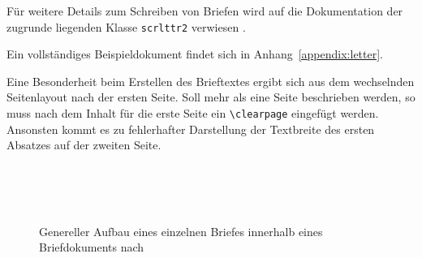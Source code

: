 Für weitere Details zum Schreiben von Briefen wird auf die Dokumentation
der zugrunde liegenden Klasse \lstinline{scrlttr2} verwiesen
\cite[S.162ff]{koma-skript}.

Ein vollständiges Beispieldokument findet sich in Anhang~\ref{appendix:letter}.

\begin{important}
Eine Besonderheit beim Erstellen des Brieftextes ergibt sich aus dem wechselnden
Seitenlayout nach der ersten Seite.
Soll mehr als eine Seite beschrieben werden, so muss nach
dem Inhalt für die erste Seite ein \lstinline{\clearpage} eingefügt werden.
Ansonsten kommt es zu fehlerhafter Darstellung der Textbreite des ersten
Absatzes auf der zweiten Seite.
\end{important}


\begin{figure}[!ht]
  \centering\small
  \\[1pt]
  \\[1pt]
  \\[\dp\strutbox]
  \caption[Genereller Aufbau eines einzelnen Briefes innerhalb eines
    Briefdokuments]{Genereller Aufbau eines einzelnen Briefes
    innerhalb eines Briefdokuments nach \cite[S.171]{koma-skript} }
  \label{fig:scrlttr2.letter}
\end{figure}


